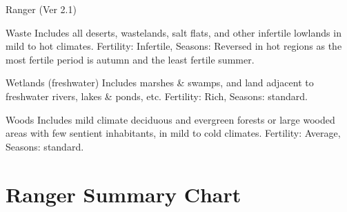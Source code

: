 \begin{Chapter}{Ranger (Ver 2.1)}
\begin{Description}
\item[Waste] Includes all deserts, wastelands, salt flats, and other
  infertile lowlands in mild to hot climates.  Fertility: Infertile,
  Seasons: Reversed in hot regions as the most fertile period is
  autumn and the least fertile summer.

\item[Wetlands (freshwater)] Includes marshes \& swamps, and land
  adjacent to freshwater rivers, lakes \& ponds, etc.  Fertility:
  Rich, Seasons: standard.

\item[Woods] Includes mild climate deciduous and evergreen forests or
  large wooded areas with few sentient inhabitants, in mild to cold
  climates. Fertility: Average, Seasons: standard.

\end{Description}

\begin{table*}[t]
\section{Ranger Summary Chart}

\medskip


\end{table*}
\end{Chapter}

